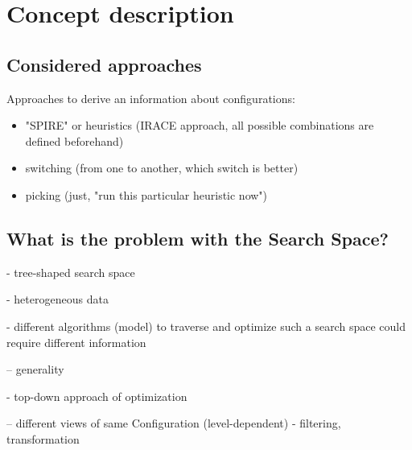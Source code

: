 \chapter{Concept description}
	

\section{Considered approaches}
Approaches to derive an information about configurations:
\begin{itemize}
  \item "SPIRE" or heuristics (IRACE approach, all possible combinations are defined beforehand)
  \item switching (from one to another, which switch is better)
  \item picking (just, "run this particular heuristic now")
\end{itemize}
	
\section{What is the problem with the Search Space?}

- tree-shaped search space

- heterogeneous data

- different algorithms (model) to traverse and optimize such a search space could require different information

-- generality 

- top-down approach of optimization

-- different views of same Configuration (level-dependent) - filtering, transformation

